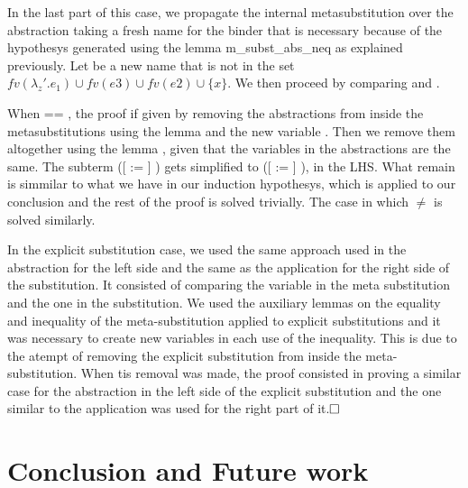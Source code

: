 In the last part of this case, we propagate the internal metasubstitution over the abstraction taking a fresh name for the binder that is necessary because of the hypothesys generated using the lemma m\_subst\_abs\_neq as explained previously. Let  be a new name that is not in the set $fv(\lambda_z'.e_1) \cup fv(e3) \cup fv(e2) \cup \{x\}$. We then proceed by comparing  and .
\begin{coqdoccode}
\end{coqdoccode}
When  == , the proof if given by removing the abstractions from inside the metasubstitutions using the lemma  and the new variable . Then we remove them altogether using the lemma , given that the variables in the abstractions are the same. The subterm    ([ := ]    ) gets simplified to ([ := ]    ), in the LHS. What remain is simmilar to what we have in our induction hypothesys, which is applied to our conclusion and the rest of the proof is solved trivially. The case in which  \ensuremath{\not=}  is solved similarly.
\begin{coqdoccode}
\end{coqdoccode}
In the explicit substitution case, we used the same approach used in the abstraction for the left side and the same as the application for the right side of the substitution. It consisted of comparing the variable in the meta substitution and the one in the substitution. We used the auxiliary lemmas on the equality and inequality of the meta-substitution applied to explicit substitutions and it was necessary to create new variables in each use of the inequality. This is due to the atempt of removing the explicit substitution from inside the meta-substitution. When tis removal was made, the proof consisted in proving a similar case for the abstraction in the left side of the explicit substitution and the one similar to the application was used for the right part of it.$\hfill\Box$
\begin{coqdoccode}
\coqdocemptyline
\end{coqdoccode}
\section{Conclusion and Future work}



